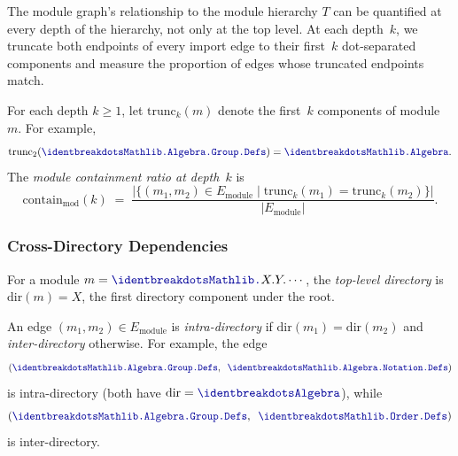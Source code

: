 The module graph's relationship to the module hierarchy $T$ can be quantified at every depth of the hierarchy, not only at the top level. At each depth~$k$, we truncate both endpoints of every import edge to their first~$k$ dot-separated components and measure the proportion of edges whose truncated endpoints match.

\begin{definition}
\label{def:module-containment}
For each depth $k \ge 1$, let $\mathrm{trunc}_k(m)$ denote the first~$k$ components of module~$m$. For example,
\[
  \mathrm{trunc}_2(\module{Mathlib.Algebra.Group.Defs}) = \module{Mathlib.Algebra}.
\]
The \emph{module containment ratio at depth~$k$} is
\[
  \mathrm{contain}_{\mathrm{mod}}(k) \;=\; \frac{|\{(m_1,m_2) \in E_{\mathrm{module}} \mid \mathrm{trunc}_k(m_1) = \mathrm{trunc}_k(m_2)\}|}{|E_{\mathrm{module}}|}.
\]
\end{definition}

\subsubsection{Cross-Directory Dependencies}
\label{sec:cross-namespace}

\begin{definition}
For a module $m = \module{Mathlib.}X.Y.\cdots$, the \emph{top-level directory} is $\mathrm{dir}(m) = X$, the first directory component under the  root.
\end{definition}

\begin{definition}
An edge $(m_1, m_2) \in E_{\mathrm{module}}$ is \emph{intra-directory} if $\mathrm{dir}(m_1) = \mathrm{dir}(m_2)$ and \emph{inter-directory} otherwise. For example, the edge
\[
  (\module{Mathlib.Algebra.Group.Defs},\;\; \module{Mathlib.Algebra.Notation.Defs})
\]
is intra-directory (both have $\mathrm{dir} = \module{Algebra}$), while
\[
  (\module{Mathlib.Algebra.Group.Defs},\;\; \module{Mathlib.Order.Defs})
\]
is inter-directory.
\end{definition}

